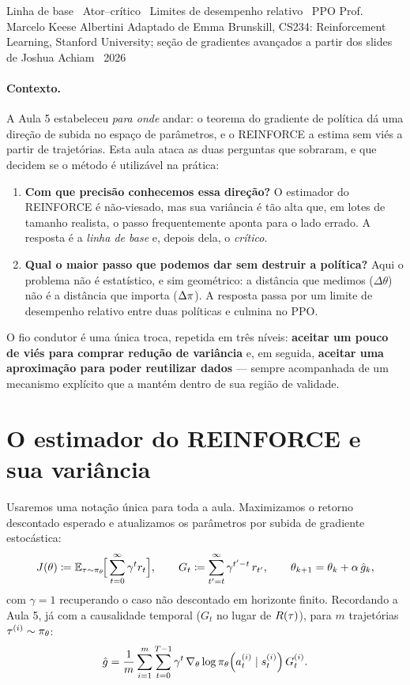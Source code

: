 \documentclass[11pt, a4paper]{article}
\newcommand{\ghat}{\hat{g}}
\begin{document}
     {Linha de base \textbullet\ Ator--crítico \textbullet\ Limites de desempenho relativo \textbullet\ PPO}
     {Prof. Marcelo Keese Albertini}
     {Adaptado de Emma Brunskill, CS234: Reinforcement Learning, Stanford University;
      seção de gradientes avançados a partir dos slides de Joshua Achiam \textbullet\ 2026}

\paragraph{Contexto.} A Aula 5 estabeleceu \emph{para onde} andar: o teorema do
gradiente de política dá uma direção de subida no espaço de parâmetros, e o
REINFORCE a estima sem viés a partir de trajetórias. Esta aula ataca as duas
perguntas que sobraram, e que decidem se o método é utilizável na prática:

\begin{enumerate}
  \item \textbf{Com que precisão conhecemos essa direção?} O estimador do
        REINFORCE é não-viesado, mas sua variância é tão alta que, em lotes de
        tamanho realista, o passo frequentemente aponta para o lado errado.
        A resposta é a \emph{linha de base} e, depois dela, o \emph{crítico}.
  \item \textbf{Qual o maior passo que podemos dar sem destruir a política?}
        Aqui o problema não é estatístico, e sim geométrico: a distância que
        medimos ($\Delta\theta$) não é a distância que importa ($\Delta\pi$).
        A resposta passa por um limite de desempenho relativo entre duas
        políticas e culmina no PPO.
\end{enumerate}

O fio condutor é uma única troca, repetida em três níveis: \textbf{aceitar um
pouco de viés para comprar redução de variância} e, em seguida, \textbf{aceitar
uma aproximação para poder reutilizar dados} --- sempre acompanhada de um
mecanismo explícito que a mantém dentro de sua região de validade.

\section{O estimador do REINFORCE e sua variância}

Usaremos uma notação única para toda a aula. Maximizamos o retorno descontado
esperado e atualizamos os parâmetros por subida de gradiente estocástica:
\[
  J(\theta) \defeq \E_{\tau\sim\pol_\theta}\!\Big[\sum_{t=0}^{\infty}\gamma^t r_t\Big],
  \qquad
  G_t \defeq \sum_{t'=t}^{\infty}\gamma^{t'-t}\, r_{t'},
  \qquad
  \theta_{k+1} = \theta_k + \alpha\,\ghat_k,
\]
com $\gamma = 1$ recuperando o caso não descontado em horizonte finito.
Recordando a Aula 5, já com a causalidade temporal ($G_t$ no lugar de
$R(\tau)$), para $m$ trajetórias $\tau^{(i)}\sim\pi_\theta$:
\[
  \ghat = \frac{1}{m}\sum_{i=1}^{m}\sum_{t=0}^{T-1}\gamma^t\,
    \nabla_\theta \log \pol_\theta\!\left(a_t^{(i)} \mid s_t^{(i)}\right) G_t^{(i)}.
\]
\end{document}
